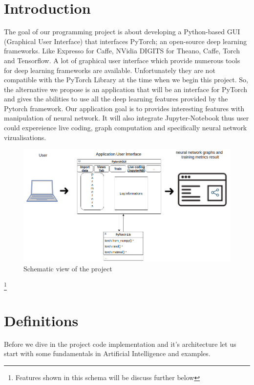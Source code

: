 \section{Introduction}

 The goal of our programming project is about developing a Python-based GUI (Graphical User Interface) that interfaces PyTorch; an open-source deep learning frameworks.
 \newline Like Expresso for Caffe, NVidia DIGITS for Theano, Caffe, Torch and Tensorflow. A lot of graphical user interface which provide numerous tools for deep learning frameworks are available. Unfortunately they are not compatible with the PyTorch Library at the time when we begin this project. So, the alternative we propose is an application that will be an interface for PyTorch and gives the abilities to use all the deep learning features provided by the Pytorch framework.
 \newline Our application goal is to provides interesting features with manipulation of neural network. It will also integrate Jupyter-Notebook thus user could expereience live coding, graph computation and specifically neural network vizualisations. 


\begin{figure}[!ht]
    \center
    \includegraphics[scale=0.4]{figures/schema_intro1.png}
    \caption{Schematic view of the project}
\end{figure}
\footnote{Features shown in this schema will be discuss further below}

\section{Definitions}
Before we dive in the project code implementation and it's architecture let us start with some fundamentals in Artificial Intelligence and examples.

